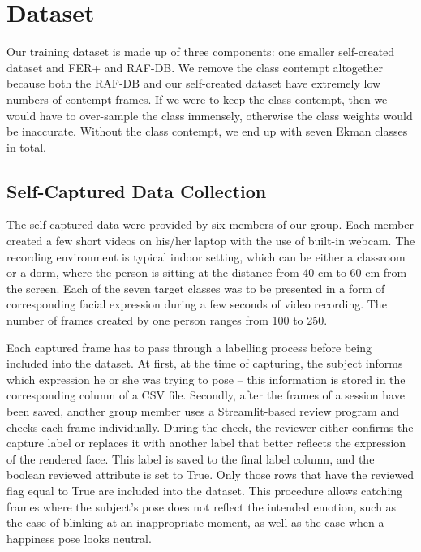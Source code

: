 \documentclass[12pt,a4paper]{article}
\begin{document}
\section{Dataset}
\label{sec:data}

Our training dataset is made up of three components: one smaller self-created dataset and
FER+ and RAF-DB. We remove the class contempt altogether because both the RAF-DB and our
self-created dataset have extremely low numbers of contempt frames. If we were to keep the
class contempt, then we would have to over-sample the class immensely, otherwise the class
weights would be inaccurate. Without the class contempt, we end up with seven Ekman
classes in total.

\subsection{Self-Captured Data Collection}
\label{sec:data:self}

The self-captured data were provided by six members of our group. Each member
created a few short videos on his/her laptop with the use of built-in webcam. The
recording environment is typical indoor setting, which can be either a classroom or a dorm,
where the person is sitting at the distance from 40 cm to 60 cm from the screen. Each of the
seven target classes was to be presented in a form of corresponding facial expression
during a few seconds of video recording. The number of frames created by one person
ranges from 100 to 250.


Each captured frame has to pass through a labelling process before being included into
the dataset. At first, at the time of capturing, the subject informs which expression he or she was trying to pose – this information is stored in the corresponding column of a CSV file. Secondly, after the frames of a session have been saved, another group member uses a Streamlit-based review program and checks each frame individually. During the check, the reviewer either confirms the capture label or replaces it with another label that better reflects the expression of the rendered face. This label is saved to the final label column, and the boolean reviewed attribute is set to True. Only those rows that have the reviewed flag equal to True are included into the dataset. This procedure allows catching frames where the subject’s pose does not reflect the intended emotion, such as the case of blinking at an inappropriate moment, as well as the case when a happiness pose looks neutral.
\end{document}
